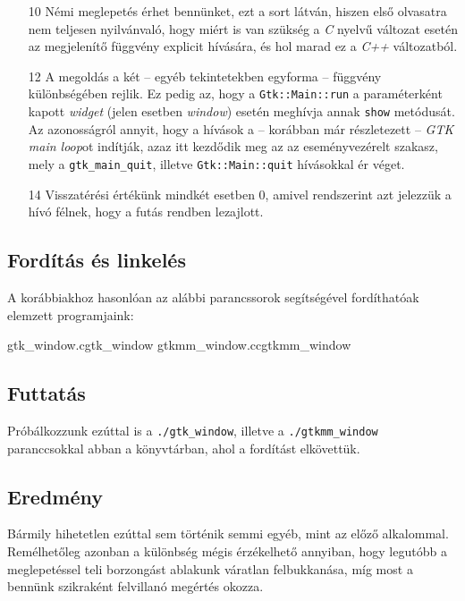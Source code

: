 \begin{enumerate}
 \item[10] Némi meglepetés érhet bennünket, ezt a sort látván, hiszen első olvasatra nem teljesen nyilvánvaló, hogy miért is van szükség a \textit{C} nyelvű változat esetén az megjelenítő függvény explicit hívására, és hol marad ez a \textit{C++} változatból.

 \item[12] A megoldás a két -- egyéb tekintetekben egyforma -- függvény különbségében rejlik. Ez pedig az, hogy a \texttt{Gtk::Main::run} a paraméterként kapott \textit{widget} (jelen esetben \textit{window}) esetén meghívja annak \texttt{show} metódusát. Az azonosságról annyit, hogy a hívások a -- korábban már részletezett -- \textit{GTK main loop}ot indítják, azaz itt kezdődik meg az az eseményvezérelt szakasz, mely a \texttt{gtk\_main\_quit}, illetve \texttt{Gtk::Main::quit} hívásokkal ér véget.

 \item[14] Visszatérési értékünk mindkét esetben 0, amivel rendszerint azt jelezzük a hívó félnek, hogy a futás rendben lezajlott.
\end{enumerate}

\subsection{Fordítás és linkelés}

A korábbiakhoz hasonlóan az alábbi parancssorok segítségével fordíthatóak e\-lem\-zett programjaink:

\lstcompiles
{gtk_window.c}{gtk_window}
{gtkmm_window.cc}{gtkmm_window}

\subsection{Futtatás}

Próbálkozzunk ezúttal is a \texttt{./gtk\_window}, illetve a \texttt{./gtkmm\_window} paranccsokkal abban a könyvtárban, ahol a fordítást elkövettük.

\subsection{Eredmény}

Bármily hihetetlen ezúttal sem történik semmi egyéb, mint az előző alkalommal. Remélhetőleg azonban a különbség mégis érzékelhető annyiban, hogy legutóbb a meglepetéssel teli borzongást ablakunk váratlan felbukkanása, míg most a bennünk szikraként felvillanó megértés okozza.
